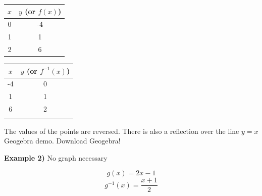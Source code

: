 \documentclass[12pt]{article}
\begin{document}
\begin{multicols}{2}
	\begin{center}
	\color{red}
	\begin{tabular}{c | c}
	
		\hspace{.5cm}$x$\hspace{.5cm} & $y$ (or $f(x)$) \\ \hline

		0 & -4 \\
		1 & 1 \\
		2 & 6
	
	\end{tabular}


	\color{blue}
	\begin{tabular}{ c | c }
		\hspace{.5cm} $x$\hspace{.5cm} & $y$ (or $f^{-1}(x)$) \\ \hline
		-4 & 0\\
		1 & 1\\
		6 & 2 \\
	\color{black}
	\end{tabular}
\end{center}
\end{multicols}

The values of the points are reversed. There is also a reflection over the line $y=x$ \\ 

Geogebra demo. Download Geogebra!



\textbf{Example 2)} No graph necessary

\color{red} $$g(x)=2x-1$$
\color{blue} $$g^{-1}(x)=\frac{x+1}{2}$$ \color{black}
\end{document}
